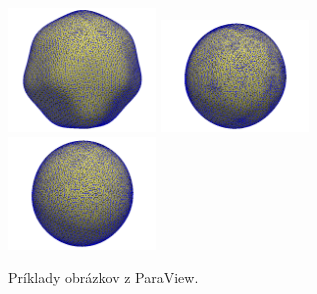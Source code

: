 \begin{figure}[p]
	\hspace{0.1\textwidth}
	\includegraphics[width=0.35\textwidth]{bumpy_omega100_level5_tstep50.png}
	\newline
	\includegraphics[width=0.35\textwidth]{bumpy_noRed_level5_tstep128.png}
	\hspace{0.1\textwidth}
	\includegraphics[width=0.35\textwidth]{bumpy_omega100_level5_tstep128.png}
	\newline
	\caption{Príklady obrázkov z ParaView.}\label{fig:bumpy_sphere} 
\end{figure}

